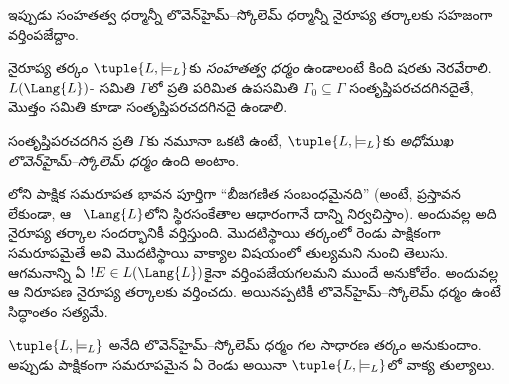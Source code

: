 \documentclass[../../../include/open-logic-section]{subfiles}
\begin{document}


ఇప్పుడు సంహతత్వ ధర్మాన్నీ లొవెన్‌హైమ్--స్కోలెమ్ ధర్మాన్నీ
నైరూప్య తర్కాలకు సహజంగా వర్తింపజేద్దాం.

\begin{defn}
నైరూప్య తర్కం $\tuple{L,\models_L}$కు \emph{సంహతత్వ ధర్మం} ఉండాలంటే
కింది షరతు నెరవేరాలి. $L(\Lang{L})$- సమితి
$\Gamma$లో ప్రతి పరిమిత ఉపసమితి $\Gamma_0\subseteq\Gamma$
సంతృప్తిపరచదగినదైతే, మొత్తం సమితి కూడా సంతృప్తిపరచదగినదై ఉండాలి.
\end{defn}

\begin{defn}
సంతృప్తిపరచదగిన ప్రతి $\Gamma$కు
 నమూనా ఒకటి ఉంటే,
$\tuple{L,\models_L}$కు \emph{అధోముఖ లొవెన్‌హైమ్--స్కోలెమ్ ధర్మం}
ఉంది అంటాం.
\end{defn}

లోని పాక్షిక సమరూపత భావన పూర్తిగా
“బీజగణిత సంబంధమైనది” (అంటే, 
ప్రస్తావన లేకుండా, ఆ 
~$\Lang{L}$లోని స్థిరసంకేతాల ఆధారంగానే
దాన్ని నిర్వచిస్తాం). అందువల్ల అది
నైరూప్య తర్కాల సందర్భానికీ వర్తిస్తుంది. మొదటిస్థాయి తర్కంలో రెండు
 పాక్షికంగా సమరూపమైతే అవి
మొదటిస్థాయి వాక్యాల విషయంలో తుల్యమని 
నుంచి తెలుసు.  ఆగమనాన్ని ఏ $!E\in L(\Lang{L})$కైనా
వర్తింపజేయగలమని ముందే అనుకోలేం. అందువల్ల ఆ నిరూపణ నైరూప్య తర్కాలకు వర్తించదు. అయినప్పటికీ లొవెన్‌హైమ్--స్కోలెమ్
ధర్మం ఉంటే సిద్ధాంతం సత్యమే.

\begin{thm}
$\tuple{L,\models_L}$ అనేది లొవెన్‌హైమ్--స్కోలెమ్ ధర్మం గల సాధారణ
తర్కం అనుకుందాం. అప్పుడు పాక్షికంగా సమరూపమైన ఏ రెండు
 అయినా $\tuple{L,\models_L}$లో
  వాక్య తుల్యాలు.
\end{thm}
\end{document}

